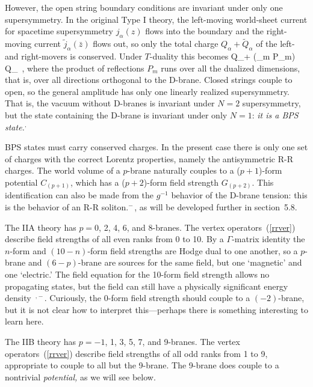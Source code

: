 However, the open string boundary conditions are invariant under only one
supersymmetry.  In the original Type I theory, the left-moving world-sheet
current for spacetime supersymmetry $j_\alpha(z)$ flows into the boundary
and the right-moving current $\tilde j_\alpha(\bar z)$ flows out, so
only the total charge $Q_\alpha + \tilde Q_\alpha$ of the
left- and right-movers is conserved.  Under $T$-duality this becomes
\be
Q_\alpha + \left({\textstyle \prod_m} P_m\right) \tilde Q_\alpha\ , 
\ee
where the product of reflections $P_m$ runs over
all the dualized dimensions, that is, over all directions orthogonal to the
D-brane.  Closed strings couple to open, so the general
amplitude has only one linearly realized supersymmetry.  That is, the vacuum
without D-branes is invariant under
$N=2$ supersymmetry, but the state containing the D-brane is invariant under
only $N=1$: {\it it is a BPS state.}\cite{joeone}$^{\!,\,}$\cite{gdinst}

BPS states must carry conserved charges.  In the present case there is
only one set of charges with the correct Lorentz properties, namely the
antisymmetric R-R charges.  The world volume of a $p$-brane naturally
couples to a ($p + 1$)-form potential $C_{(p+1)}$, which has a
($p + 2$)-form field strength $G_{(p+2)}$.  This identification can also
be made from the $g^{-1}$ behavior of the D-brane tension: this is the
behavior of an R-R soliton.\cite{blackp}$^{\!-\,}$\cite{coni}, as will be
developed further in section~5.8.

The IIA theory has $p = 0$, 2, 4, 6, and 8-branes.  The vertex
operators~(\ref{rrver}) describe field strengths of all even ranks from 0
to 10.  By a
$\Gamma$-matrix identity the $n$-form and $(10-n)$-form field strengths
are Hodge dual to one another, so a $p$-brane and $(6-p)$-brane are
sources for the same field, but one `magnetic' and one `electric.'  The field
equation for the 10-form field strength allows no propagating states, but
the field can still have a physically significant energy
density~\cite{joeone}$^{\!,\,}$\cite{romans}$^{\!-\,}$\cite{joeandy}. 
Curiously, the 0-form field strength should couple to a $(-2)$-brane, but it
is not clear how to interpret this---perhaps there is something interesting
to learn here. 

The IIB theory has $p = -1$, 1, 3, 5, 7, and 9-branes.  The vertex 
operators~(\ref{rrver}) describe field strengths of all odd ranks from 1 to
9, appropriate to couple to all but the 9-brane.  The 9-brane does couple to
a nontrivial {\it potential,} as we will see below.

